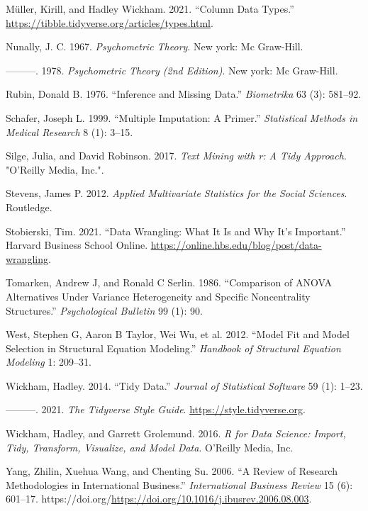 \documentclass[
  letterpaper,
]{krantz}
\newlength{\cslhangindent}
\newenvironment{CSLReferences}[2] %
 {\begin{list}{}{%
  \setlength{\itemindent}{0pt}
  \setlength{\leftmargin}{0pt}
  \setlength{\parsep}{0pt}
  \ifodd #1
   \setlength{\leftmargin}{\cslhangindent}
   \setlength{\itemindent}{-1\cslhangindent}
  \fi
  \setlength{\itemsep}{#2\baselineskip}}}
 {\end{list}}
\begin{document}
\begin{CSLReferences}{1}{0}
Müller, Kirill, and Hadley Wickham. 2021. {``Column Data Types.''}
\url{https://tibble.tidyverse.org/articles/types.html}.

Nunally, J. C. 1967. \emph{Psychometric Theory}. New york: Mc Graw-Hill.

---------. 1978. \emph{Psychometric Theory (2nd Edition)}. New york: Mc
Graw-Hill.

Rubin, Donald B. 1976. {``Inference and Missing Data.''}
\emph{Biometrika} 63 (3): 581--92.

Schafer, Joseph L. 1999. {``Multiple Imputation: A Primer.''}
\emph{Statistical Methods in Medical Research} 8 (1): 3--15.

Silge, Julia, and David Robinson. 2017. \emph{Text Mining with r: A Tidy
Approach}. "O'Reilly Media, Inc.".

Stevens, James P. 2012. \emph{Applied Multivariate Statistics for the
Social Sciences}. Routledge.

Stobierski, Tim. 2021. {``Data Wrangling: What It Is and Why It's
Important.''} Harvard Business School Online.
\url{https://online.hbs.edu/blog/post/data-wrangling}.

Tomarken, Andrew J, and Ronald C Serlin. 1986. {``Comparison of ANOVA
Alternatives Under Variance Heterogeneity and Specific Noncentrality
Structures.''} \emph{Psychological Bulletin} 99 (1): 90.

West, Stephen G, Aaron B Taylor, Wei Wu, et al. 2012. {``Model Fit and
Model Selection in Structural Equation Modeling.''} \emph{Handbook of
Structural Equation Modeling} 1: 209--31.

Wickham, Hadley. 2014. {``Tidy Data.''} \emph{Journal of Statistical
Software} 59 (1): 1--23.

---------. 2021. \emph{The Tidyverse Style Guide}.
\url{https://style.tidyverse.org}.

Wickham, Hadley, and Garrett Grolemund. 2016. \emph{R for Data Science:
Import, Tidy, Transform, Visualize, and Model Data}. {O'Reilly Media,
Inc.}

Yang, Zhilin, Xuehua Wang, and Chenting Su. 2006. {``A Review of
Research Methodologies in International Business.''} \emph{International
Business Review} 15 (6): 601--17.
https://doi.org/\url{https://doi.org/10.1016/j.ibusrev.2006.08.003}.

\end{CSLReferences}



\backmatter
\printindex
\end{document}
